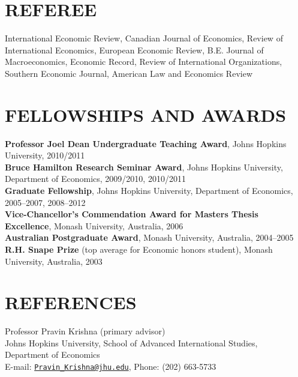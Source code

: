 \documentclass[11pt]{res}
\begin{document}
\begin{resume}
\newpage
\phantom{.}\vspace{.4cm}

\section{REFEREE} \vspace{3mm}

International Economic Review, Canadian Journal of Economics, Review of International Economics, European Economic Review, B.E. Journal of Macroeconomics, Economic Record, Review of International Organizations, Southern Economic Journal, American Law and Economics Review\\

\section{FELLOWSHIPS AND AWARDS}\vspace{2mm}
{\bf Professor Joel Dean Undergraduate Teaching Award}, Johns Hopkins University, 2010/2011\vspace{1.5mm}\\
{\bf Bruce Hamilton Research Seminar Award}, Johns Hopkins University, Department of Economics, 2009/2010, 2010/2011\vspace{1.5mm}\\
{\bf Graduate Fellowship}, Johns Hopkins University, Department of Economics, 2005--2007, 2008--2012\vspace{1.5mm}\\
{\bf Vice-Chancellor's Commendation Award for Masters Thesis Excellence}, Monash University, Australia, 2006\vspace{1.5mm}\\
{\bf Australian Postgraduate Award}, Monash University, Australia, 2004--2005\vspace{1.5mm}\\
{\bf R.H. Snape Prize} (top average for Economic honors student), Monash University, Australia, 2003 \\


\section{REFERENCES}\vspace{2mm}
Professor Pravin Krishna (primary advisor)\\
Johns Hopkins University, School of Advanced International Studies,\\ Department of Economics\\
E-mail: \href{mailto:Pravin_Krishna@jhu.edu}{\texttt{Pravin\_Krishna@jhu.edu}}, Phone: (202) 663-5733\\


\end{resume}
\end{document}
